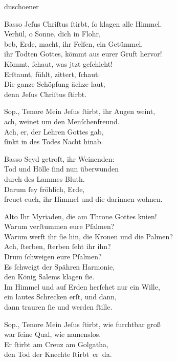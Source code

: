 \documentclass[shorttitlesize=55,tocstyle=ref-genre]{ees}
\begin{document}
{\begin{movement}{duschoener}
  \item[Basso]
  Jeſus Chriſtus ſtirbt, ſo klagen alle Himmel.\\
  Verhül, o Sonne, dich in Flohr,\\
  beb, Erde, macht, ihr Felſen, ein Getümmel,\\
  ihr Todten Gottes, kömmt aus eurer Gruft hervor!\\
  Kömmt, ſchaut, was jtzt geſchieht!\\
  Erſtaunt, fühlt, zittert, ſchaut:\\
  Die ganze Schöpfung ächze laut,\\
  denn Jeſus Chriſtus ſtirbt.

  \item[Sop., Tenore]
  Mein Jeſus ſtirbt, ihr Augen weint,\\
  ach, weinet um den Menſchenfreund.\\
  Ach, er, der Lehren Gottes gab,\\
  ſinkt in des Todes Nacht hinab.

  \item[Basso]
  Seyd getroſt, ihr Weinenden:\\
  Tod und Hölle ſind nun überwunden\\
  durch des Lammes Bluth.\\
  Darum ſey fröhlich, Erde,\\
  freuet euch, ihr Himmel und die darinnen wohnen.

  \item[Alto]
  Ihr Myriaden, die am Throne Gottes knien!\\
  Warum verſtummen eure Pſalmen?\\
  Warum werft ihr ſie hin, die Kronen und die Palmen?\\
  Ach, ſterben, ſterben ſeht ihr ihn?\\
  Drum ſchweigen eure Pſalmen?\\
  Es ſchweigt der Spähren Harmonie,\\
  den König Salems klagen ſie.\\
  Im Himmel und auf Erden herſchet nur ein Wille,\\
  ein lautes Schrecken erſt, und dann,\\
  dann trauren ſie und werden ſtille.

  \item[Sop., Tenore]
  Mein Jeſus ſtirbt, wie furchtbar groß\\
  war ſeine Qual, wie namenslos.\\
  Er ſtirbt am Creuz am Golgatha,\\
  den Tod der Knechte ſtirbt er da.


\end{movement}}
\end{document}
